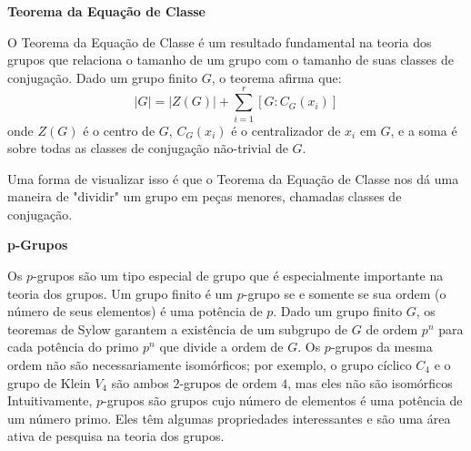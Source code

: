 \documentclass{article}
\begin{document}
\textbf{Teorema da Equação de Classe}

O Teorema da Equação de Classe é um resultado fundamental na teoria dos grupos que relaciona o tamanho de um grupo com o tamanho de suas classes de conjugação. Dado um grupo finito $G$, o teorema afirma que:
\[
|G| = |Z(G)| + \sum_{i=1}^r [G : C_G(x_i)]
\]
onde $Z(G)$ é o centro de $G$, $C_G(x_i)$ é o centralizador de $x_i$ em $G$, e a soma é sobre todas as classes de conjugação não-trivial de $G$. 

Uma forma de visualizar isso é que o Teorema da Equação de Classe nos dá uma
maneira de "dividir" um grupo em peças menores, chamadas classes de conjugação.

\textbf{p-Grupos}

Os $p$-grupos são um tipo especial de grupo que é especialmente importante na
teoria dos grupos. Um grupo finito é um $p$-grupo se e somente se sua ordem 
(o número de seus elementos) é uma potência de $p$. Dado um grupo finito $G$,
os teoremas de Sylow garantem a existência de um subgrupo de $G$ de ordem
$p^n$ para cada potência do primo $p^n$ que divide a ordem de $G$.
Os $p$-grupos da mesma ordem não são necessariamente isomórficos;
por exemplo, o grupo cíclico $C_4$ e o grupo de Klein $V_4$ são ambos
$2$-grupos de ordem $4$, mas eles não são isomórficos
Intuitivamente, $p$-grupos são grupos cujo número de elementos é uma potência
de um número primo. Eles têm algumas propriedades interessantes e são uma área
ativa de pesquisa na teoria dos grupos.
\end{document}
